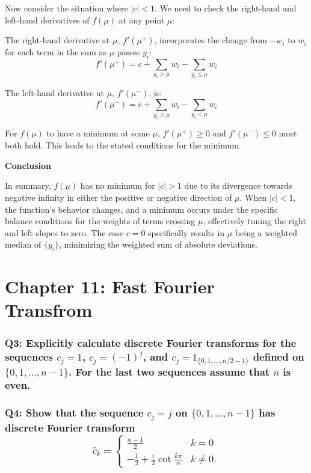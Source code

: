 \documentclass[8pt]{article}
\begin{document}
Now consider the situation where \( |c| < 1 \). We need to check the right-hand and left-hand derivatives of \( f(\mu) \) at any point \( \mu \):

The right-hand derivative at \( \mu \), \( f'(\mu^+) \), incorporates the change from \( -w_i \) to \( w_i \) for each term in the sum as \( \mu \) passes \( y_i \):
\[
f'(\mu^+) = c + \sum_{y_i > \mu} w_i - \sum_{y_i \leq \mu} w_i
\]

The left-hand derivative at \( \mu \), \( f'(\mu^-) \), is:
\[
f'(\mu^-) = c + \sum_{y_i \geq \mu} w_i - \sum_{y_i < \mu} w_i
\]

For \( f(\mu) \) to have a minimum at some \( \mu \), \( f'(\mu^+) \geq 0 \) and \( f'(\mu^-) \leq 0 \) must both hold. This leads to the stated conditions for the minimum.

\textbf{Conclusion}

In summary, \( f(\mu) \) has no minimum for \( |c| > 1 \) due to its divergence towards negative infinity in either the positive or negative direction of \( \mu \). When \( |c| < 1 \), the function's behavior changes, and a minimum occurs under the specific balance conditions for the weights of terms crossing \( \mu \), effectively tuning the right and left slopes to zero. The case \( c = 0 \) specifically results in \( \mu \) being a weighted median of \( \{y_i\} \), minimizing the weighted sum of absolute deviations.

\newpage
\section*{Chapter 11: Fast Fourier Transfrom}

\subsubsection*{Q3:
Explicitly calculate discrete Fourier transforms for the sequences \( c_j = 1 \), \( c_j = (-1)^j \), and \( c_j = 1_{\{0,1,\ldots,n/2-1\}} \) defined on \(\{0, 1, \ldots, n-1\}\). For the last two sequences assume that \(n\) is even.}

\subsubsection*{Q4:
Show that the sequence \( c_j = j \) on \(\{0, 1, \ldots, n-1\}\) has discrete Fourier transform
\[
   \hat{c}_k = \begin{cases} 
   \frac{n-1}{2} & k = 0 \\
   -\frac{1}{2} + \frac{i}{2} \cot \frac{k\pi}{n} & k \neq 0.
   \end{cases}
\]}
\end{document}
